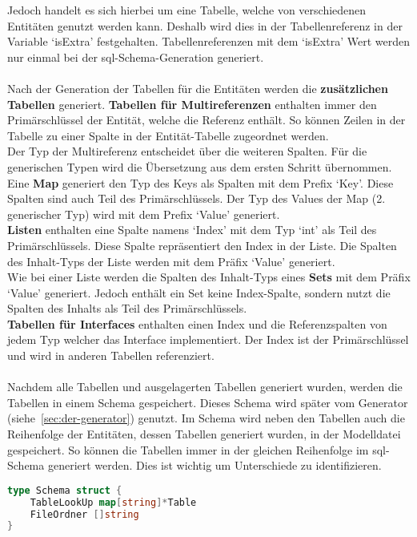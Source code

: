 \documentclass[./einleitung.tex]{subfiles}
\begin{document}
    Jedoch handelt es sich hierbei um eine Tabelle, welche von verschiedenen Entitäten genutzt werden kann.
    Deshalb wird dies in der Tabellenreferenz in der Variable `isExtra' festgehalten.
    Tabellenreferenzen mit dem `isExtra' Wert werden nur einmal bei der \acrshort{sql}-Schema-Generation generiert.
    \\\\
    Nach der Generation der Tabellen für die Entitäten werden die \textbf{zusätzlichen Tabellen} generiert.
    \textbf{Tabellen für Multireferenzen} enthalten immer den Primärschlüssel der Entität, welche die Referenz enthält.
    So können Zeilen in der Tabelle zu einer Spalte in der Entität-Tabelle zugeordnet werden.\\
    Der Typ der Multireferenz entscheidet über die weiteren Spalten.
    Für die generischen Typen wird die Übersetzung aus dem ersten Schritt übernommen.\\
    Eine \textbf{Map} generiert den Typ des Keys als Spalten mit dem Prefix `Key'.
    Diese Spalten sind auch Teil des Primärschlüssels.
    Der Typ des Values der Map (2. generischer Typ) wird mit dem Prefix `Value' generiert.\\
    \textbf{Listen} enthalten eine Spalte namens `Index' mit dem Typ `int' als Teil des Primärschlüssels.
    Diese Spalte repräsentiert den Index in der Liste.
    Die Spalten des Inhalt-Typs der Liste werden mit dem Präfix `Value' generiert.\\
    Wie bei einer Liste werden die Spalten des Inhalt-Typs eines \textbf{Sets} mit dem Präfix `Value' generiert.
    Jedoch enthält ein Set keine Index-Spalte, sondern nutzt die Spalten des Inhalts als Teil des Primärschlüssels.\\
    \textbf{Tabellen für Interfaces} enthalten einen Index und die Referenzspalten von jedem Typ welcher das Interface implementiert.
    Der Index ist der Primärschlüssel und wird in anderen Tabellen referenziert.
    \\\\
    Nachdem alle Tabellen und ausgelagerten Tabellen generiert wurden, werden die Tabellen in einem Schema gespeichert.
    Dieses Schema wird später vom Generator (siehe~\ref{sec:der-generator}) genutzt.
    Im Schema wird neben den Tabellen auch die Reihenfolge der Entitäten, dessen Tabellen generiert wurden, in der Modelldatei gespeichert.
    So können die Tabellen immer in der gleichen Reihenfolge im \acrshort{sql}-Schema generiert werden.
    Dies ist wichtig um Unterschiede zu identifizieren.
    \begin{lstlisting}[language=Go, caption=Datenstruktur Schema, label=lst:schema]
type Schema struct {
	TableLookUp map[string]*Table
    FileOrdner []string
}
    \end{lstlisting}
\end{document}
